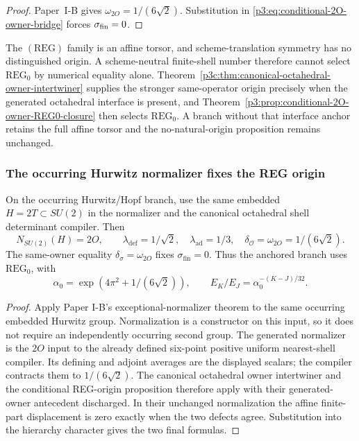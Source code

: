 \documentclass[12pt,a4paper]{article}
\begin{document}
\begin{proof}
Paper~I-B gives \(\omega_{2O}=1/(6\sqrt2)\).  Substitution in
\eqref{p3:eq:conditional-2O-owner-bridge} forces
\(\sigma_{\rm fin}=0\).
\end{proof}

\begin{remark}
The \((\mathrm{REG})\) family is an affine torsor, and scheme-translation
symmetry has no distinguished origin.  A scheme-neutral finite-shell number
therefore cannot select \(\mathrm{REG}_0\) by numerical equality alone.
Theorem~\ref{p3c:thm:canonical-octahedral-owner-intertwiner} supplies the
stronger same-operator origin precisely when the generated octahedral
interface is present, and
Theorem~\ref{p3:prop:conditional-2O-owner-REG0-closure} then selects
\(\mathrm{REG}_0\).  A branch without that interface anchor retains the full
affine torsor and the no-natural-origin proposition remains unchanged.
\end{remark}



\subsubsection{The occurring Hurwitz normalizer fixes the REG origin}

\begin{theorem}
\label{p3c:thm:occurring-hurwitz-reg-origin}
On the occurring Hurwitz/Hopf branch, use the same embedded
\(H=2T\subset SU(2)\) in the normalizer and the canonical octahedral
shell determinant compiler.  Then
\[
 N_{SU(2)}(H)=2O,\qquad
 \lambda_{\mathrm{def}}=1/\sqrt2,\quad
 \lambda_{\mathrm{ad}}=1/3,\quad
 \delta_{\mathcal O}=\omega_{2O}=1/(6\sqrt2).
\]
The same-owner equality
\(\delta_\sigma=\omega_{2O}\) fixes \(\sigma_{\mathrm{fin}}=0\).
Thus the anchored branch uses \(\mathrm{REG}_0\), with
\[
 \alpha_0=\exp(4\pi^2+1/(6\sqrt2)),\qquad
 E_K/E_J=\alpha_0^{-(K-J)/32}.
\]
\end{theorem}
\begin{proof}
Apply Paper I-B's exceptional-normalizer theorem to the same
occurring embedded Hurwitz group.  Normalization is a constructor
on this input, so it does not require an independently occurring
second group.  The generated normalizer is the \(2O\) input to the
already defined six-point positive uniform nearest-shell compiler.
Its defining and adjoint averages are the displayed scalars;
the compiler contracts them to \(1/(6\sqrt2)\).
The canonical octahedral owner intertwiner and the conditional
REG-origin proposition therefore apply with their generated-owner
antecedent discharged.  In their unchanged normalization the
affine finite-part displacement is zero exactly when the two
defects agree.  Substitution into the hierarchy character gives
the two final formulas.
\end{proof}
\end{document}
